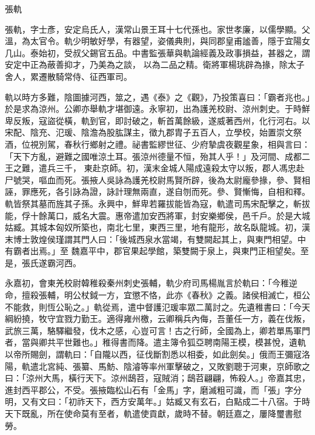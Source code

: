 
\begin{pinyinscope}
張軌



 張軌，字士彥，安定烏氏人，漢常山景王耳十七代孫也。家世孝廉，以儒學顯。父溫，為太官令。軌少明敏好學，有器望，姿儀典則，與同郡皇甫謐善，隱于宜陽女几山。泰始初，受叔父錫官五品。中書監張華與軌論經義及政事損益，甚器之，謂安定中正為蔽善抑才，乃美為之談，
 以為二品之精。衛將軍楊珧辟為掾，除太子舍人，累遷散騎常侍、征西軍司。



 軌以時方多難，陰圖據河西，筮之，遇《泰》之《觀》，乃投策喜曰：「霸者兆也。」於是求為涼州。公卿亦舉軌才堪御遠。永寧初，出為護羌校尉、涼州刺史。于時鮮卑反叛，寇盜從橫，軌到官，即討破之，斬首萬餘級，遂威著西州，化行河右。以宋配、陰充、氾瑗、陰澹為股肱謀主，徵九郡胄子五百人，立學校，始置崇文祭酒，位視別駕，春秋行鄉射之禮。祕書監繆世征、少府摯虞夜觀星象，相與言曰：「天下方亂，避難之國唯涼土耳。張涼州德量不恒，殆其人乎！」及河間、成都二王之難，遣兵三千，
 東赴京師。初，漢末金城人陽成遠殺太守以叛，郡人馮忠赴尸號哭，嘔血而死。張掖人吳詠為護羌校尉馬賢所辟，後為太尉龐參掾，參、賢相誣，罪應死，各引詠為證，詠計理無兩直，遂自刎而死。參、賢慚悔，自相和釋。軌皆祭其墓而旌其子孫。永興中，鮮卑若羅拔能皆為寇，軌遣司馬宋配擊之，斬拔能，俘十餘萬口，威名大震。惠帝遣加安西將軍，封安樂鄉侯，邑千戶。於是大城姑臧。其城本匈奴所築也，南北七里，東西三里，地有龍形，故名臥龍城。初，漢末博士敦煌侯瑾謂其門人曰：「後城西泉水當竭，有雙闕起其上，與東門相望。中有霸者出焉。」至
 魏嘉平中，郡官果起學館，築雙闕于泉上，與東門正相望矣。至是，張氏遂霸河西。



 永嘉初，會東羌校尉韓稚殺秦州刺史張輔，軌少府司馬楊胤言於軌曰：「今稚逆命，擅殺張輔，明公杖鉞一方，宜懲不恪，此亦《春秋》之義。諸侯相滅亡，桓公不能救，則恆公恥之。」軌從焉，遣中督護氾瑗率眾二萬討之。先遺稚書曰：「今天綱紛撓，牧守宜戮力勤王。適得雍州檄，云卿稱兵內侮，吾董任一方，義在伐叛，武旅三萬，駱驛繼發，伐木之感，心豈可言！古之行師，全國為上，卿若單馬軍門者，當與卿共平世難也。」稚得書而降。遣主簿令狐亞聘南陽王模，模甚悅，遺軌
 以帝所賜劍，謂軌曰：「自隴以西，征伐斷割悉以相委，如此劍矣。」俄而王彌寇洛陽，軌遣北宮純、張纂、馬魴、陰濬等率州軍擊破之，又敗劉聰于河東，京師歌之曰：「涼州大馬，橫行天下。涼州鴟苕，寇賊消；鴟苕翩翩，怖殺人。」帝嘉其忠，進封西平郡公，不受。張掖臨松山石有「金馬」字，磨滅粗可識，而「張」字分明，又有文曰：「初祚天下，西方安萬年。」姑臧又有玄石，白點成二十八宿。于時天下既亂，所在使命莫有至者，軌遣使貢獻，歲時不替。朝廷嘉之，屢降璽書慰勞。




\end{pinyinscope}
